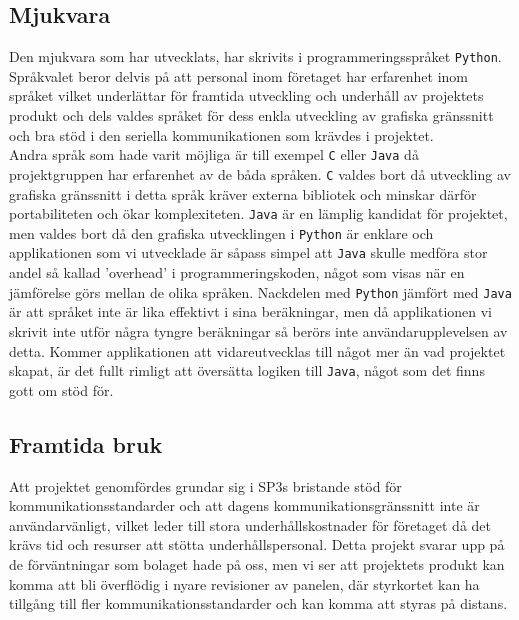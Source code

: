 \documentclass{article}
\begin{document}

        \subsection{Mjukvara} %
        \label{sub:d_mjukvara}

            Den mjukvara som har utvecklats, har skrivits i programmeringsspråket \texttt{Python}. Språk\-valet beror delvis på att personal inom företaget har erfarenhet inom språket vilket underlättar för framtida utveckling och underhåll av projektets produkt och dels valdes språket för dess enkla utveckling av grafiska gränssnitt och bra stöd i den seriella kommunikationen som krävdes i projektet. \\

            \noindent Andra språk som hade varit möjliga är till exempel \texttt{C} eller \texttt{Java} då projektgruppen har erfarenhet av de båda språken. \texttt{C} valdes bort då utveckling av grafiska gränssnitt i detta språk kräver externa bibliotek och minskar därför portabiliteten och ökar komplexiteten. \texttt{Java} är en lämplig kandidat för projektet, men valdes bort då den grafiska utvecklingen i \texttt{Python} är enklare och applikationen som vi utvecklade är såpass simpel att \texttt{Java} skulle medföra stor andel så kallad 'overhead' i programmeringskoden, något som visas när en jämförelse görs mellan de olika språken.\cite{Ferg}  Nackdelen med \texttt{Python} jämfört med \texttt{Java} är att språket inte är lika effektivt i sina beräkningar, men då applikationen vi skrivit inte utför några tyngre beräkningar så berörs inte användar\-upplevelsen  av detta. Kommer applikationen att vidareutvecklas till något mer än vad projektet skapat, är det fullt rimligt att översätta logiken till \texttt{Java}, något som det finns gott om stöd för.\cite{jython}
        
        \subsection{Framtida bruk} %
        \label{sub:framtida_bruk}
            Att projektet genomfördes grundar sig i SP3s bristande stöd för kommunikationsstandarder och att dagens kommunikationsgränssnitt inte är användarvänligt, vilket leder till stora underhållskostnader för företaget då det krävs tid och resurser att stötta underhålls\-personal. Detta projekt svarar upp på de förväntningar som bolaget hade på oss, men vi ser att projektets produkt kan komma att bli överflödig i nyare revisioner av panelen, där styrkortet kan ha tillgång till fler kommunikationsstandarder och kan komma att styras på distans.
\end{document}

